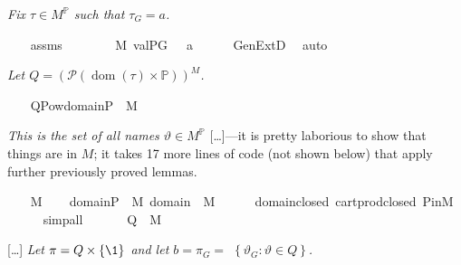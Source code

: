 \textit{Fix $\tau \in  M^{\mathbb{P}}$ such that $\tau_{G}=a$.}
\begin{isabelle}
\ \ \isamarkupfalse%
\ assms\isanewline
\ \ \isamarkupfalse%
\ {\isasymtau}\ \ {\isachardoublequoteopen}{\isasymtau}\ {\isasymin}\ M{\isachardoublequoteclose}\ {\isachardoublequoteopen}val{\isacharparenleft}{\kern0pt}P{\isacharcomma}{\kern0pt}G{\isacharcomma}{\kern0pt}\ {\isasymtau}{\isacharparenright}{\kern0pt}\ {\isacharequal}{\kern0pt}\ a{\isachardoublequoteclose}\isanewline
\ \ \ \ \isamarkupfalse%
\ GenExtD\ \isamarkupfalse%
\ auto
\end{isabelle}
\textit{Let
  $Q=(\mathcal{P}(\operatorname{dom}(\tau) \times
  \mathbb{P}))^{M}$.}
\begin{isabelle}
\ \ \isamarkupfalse%
\ {\isacharquery}{\kern0pt}Q{\isacharequal}{\kern0pt}{\isachardoublequoteopen}Pow{\isacharparenleft}{\kern0pt}domain{\isacharparenleft}{\kern0pt}{\isasymtau}{\isacharparenright}{\kern0pt}{\isasymtimes}P{\isacharparenright}{\kern0pt}\ {\isasyminter}\ M{\isachardoublequoteclose}
\end{isabelle}
\textit{This is the set of all names $\vartheta \in
  M^{\mathbb{P}}$} [\dots]---it is pretty laborious to show that things
are in $M$; it takes 17 more lines of code (not shown below) that
apply further previously proved lemmas.
\begin{isabelle}
\ \ \isamarkupfalse%
\ {\isacartoucheopen}{\isasymtau}{\isasymin}M{\isacartoucheclose}\isanewline
\ \ \isamarkupfalse%
\ {\isachardoublequoteopen}domain{\isacharparenleft}{\kern0pt}{\isasymtau}{\isacharparenright}{\kern0pt}{\isasymtimes}P\ {\isasymin}\ M{\isachardoublequoteclose}\ {\isachardoublequoteopen}domain{\isacharparenleft}{\kern0pt}{\isasymtau}{\isacharparenright}{\kern0pt}\ {\isasymin}\ M{\isachardoublequoteclose}\isanewline
\ \ \ \ \isamarkupfalse%
\ domain{\isacharunderscore}{\kern0pt}closed\ cartprod{\isacharunderscore}{\kern0pt}closed\ P{\isacharunderscore}{\kern0pt}in{\isacharunderscore}{\kern0pt}M\isanewline
\ \ \ \ \isamarkupfalse%
\ simp{\isacharunderscore}{\kern0pt}all\isanewline
\ \ \isamarkupfalse%
\isanewline
\ \ \isamarkupfalse%
\ {\isachardoublequoteopen}{\isacharquery}{\kern0pt}Q\ {\isasymin}\ M{\isachardoublequoteclose}
\end{isabelle}
[\dots]\textit{ Let $\pi=Q \times\{\1\}$ and let
  $b=\pi_{G}=$ $\left\{\vartheta_{G}: \vartheta \in Q\right\}$.}
